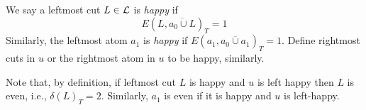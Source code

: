 
\begin{definition}We say a leftmost cut $L\in {\cal L}$  is {\em happy} if
$$E(L,\overline{a_0 \cup L})_T = 1$$
Similarly, the leftmost atom $a_1$ is {\em happy} if $E(a_1,\overline{a_0\cup a_1})_T=1$. Define  rightmost cuts in $u$ or the rightmost atom in $u$ to be happy, similarly.
\end{definition}
Note that, by definition, if leftmost cut $L$ is happy and $u$ is left happy then $L$ is even, i.e., $\delta(L)_T=2$. Similarly, $a_1$ is even if it is happy and $u$ is left-happy.

